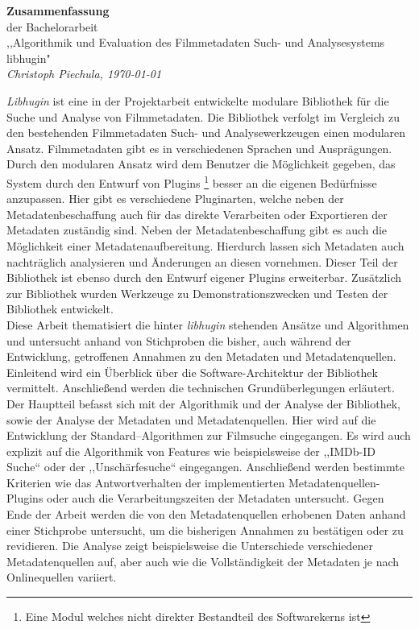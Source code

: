 \documentclass{scrartcl}
\begin{document}
\begin{center}
    \LARGE \textbf{Zusammenfassung} \\
    \vspace{.1in}
    \large der Bachelorarbeit \\
    \vspace{.1in}
    \small ,,Algorithmik und Evaluation des Filmmetadaten Such- und
    Analysesystems libhugin" \\
    \vspace{.1in}
    \small \textit{Christoph Piechula, \today}
    \vspace{.2in}
\end{center}

\textit{Libhugin} ist eine in der Projektarbeit \cite{cpiechula} entwickelte
modulare Bibliothek für die Suche und Analyse von Filmmetadaten. Die Bibliothek
verfolgt im Vergleich zu den bestehenden Filmmetadaten Such- und
Analysewerkzeugen einen modularen Ansatz. Filmmetadaten gibt es in
verschiedenen Sprachen und Ausprägungen. Durch den modularen Ansatz wird dem
Benutzer die Möglichkeit gegeben, das System durch den Entwurf von Plugins
\footnote{Eine Modul welches nicht direkter Bestandteil des Softwarekerns ist}
besser an die eigenen Bedürfnisse anzupassen. Hier gibt es verschiedene
Pluginarten, welche neben der Metadatenbeschaffung auch für das direkte
Verarbeiten oder Exportieren der Metadaten zuständig sind. Neben der
Metadatenbeschaffung gibt es auch die Möglichkeit einer Metadatenaufbereitung.
Hierdurch lassen sich Metadaten auch nachträglich analysieren und Änderungen an
diesen vornehmen. Dieser Teil der Bibliothek ist ebenso durch den Entwurf eigener
Plugins erweiterbar. Zusätzlich zur Bibliothek wurden Werkzeuge zu
Demonstrationszwecken und Testen der Bibliothek entwickelt.
\\

Diese Arbeit thematisiert die hinter \textit{libhugin} stehenden Ansätze und
Algorithmen und untersucht anhand von Stichproben die bisher, auch während der
Entwicklung, getroffenen Annahmen zu den Metadaten und Metadatenquellen.
Einleitend wird ein Überblick über die Software-Architektur der Bibliothek
vermittelt.  Anschließend werden die technischen Grundüberlegungen erläutert.
Der Hauptteil befasst sich mit der Algorithmik und der Analyse der Bibliothek, 
sowie der Analyse der Metadaten und Metadatenquellen. Hier wird auf die
Entwicklung der Standard--Algorithmen zur Filmsuche eingegangen. Es wird auch
explizit auf die Algorithmik von Features wie beispielsweise der ,,IMDb-ID
Suche`` oder der ,,Unschärfesuche`` eingegangen. Anschließend werden bestimmte
Kriterien wie das Antwortverhalten der implementierten Metadatenquellen-Plugins
oder auch die Verarbeitungszeiten der Metadaten untersucht. Gegen Ende der
Arbeit werden die von den Metadatenquellen erhobenen Daten anhand einer
Stichprobe untersucht, um die bisherigen Annahmen zu bestätigen oder zu
revidieren. Die Analyse zeigt beispielsweise die Unterschiede verschiedener
Metadatenquellen auf, aber auch wie die Vollständigkeit der Metadaten
je nach Onlinequellen variiert.  
\\
\end{document}
